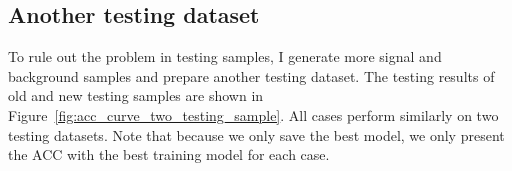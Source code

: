 \documentclass[12pt]{article}
\begin{document}
    \subsection{Another testing dataset}%
    \label{sub:another_testing_dataset}
        To rule out the problem in testing samples, I generate more signal and background samples and prepare another testing dataset. The testing results of old and new testing samples are shown in Figure~\ref{fig:acc_curve_two_testing_sample}. All cases perform similarly on two testing datasets. Note that because we only save the best model, we only present the ACC with the best training model for each case.
        \begin{figure}[htpb]
            \centering
             \\
\end{figure}
\end{document}
